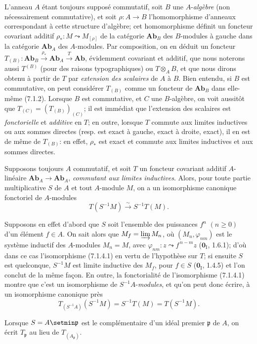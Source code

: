 \begin{env}[7.1.3]
L'anneau $A$ étant toujours supposé commutatif, soit $B$ une $A$-\emph{algèbre} (non
nécessairement commutative), et soit $\rho:A\to B$ l'homomorphisme d'anneaux
correspondant à cette structure d'algèbre; cet homomorphisme définit un
foncteur covariant
additif $\rho_*:M\leadsto M_{[\rho]}$
de la catégorie $\boldsymbol{Ab}_B$ des $B$-modules à gauche dans la catégorie
$\boldsymbol{Ab}_A$ des $A$-modules. Par composition, on en déduit un foncteur $T_{(B)}:\boldsymbol{Ab}_B\xrightarrow{\rho_*}\boldsymbol{Ab}_A\xrightarrow{T}\boldsymbol{Ab}$,
évidemment covariant et additif, que nous noterons aussi $T^{(B)}$ (pour des
raisons typographiques) ou $T\otimes_A B$, et que nous dirons obtenu à partir
de $T$ par \emph{extension des scalaires} de $A$ à $B$. Bien entendu, si $B$ est
commutative, on peut considérer $T_{(B)}$ comme un foncteur de
$\boldsymbol{Ab}_B$ dans elle-même (7.1.2). Lorsque $B$ est commutative, et $C$
une $B$-algèbre, on voit aussitôt que $T_{(C)}=(T_{(B)})_{(C)}$;
il est immédiat que l'extension des scalaires est \emph{fonctorielle} et \emph{additive} en
$T$; en outre, lorsque $T$ commute aux limites inductives ou aux sommes
directes (resp. est exact à gauche, exact à droite, exact), il en est de même
de $T_{(B)}$: en effet, $\rho_*$ est exact et commute aux limites inductives
et aux sommes directes.
\end{env}

\begin{env}[7.1.4]
Supposons toujours $A$ commutatif, et soit
$T$ un foncteur covariant additif
$A$-linéaire $\boldsymbol{Ab}_A\to\boldsymbol{Ab}_A$, \emph{commutant aux limites inductives}. Alors, pour toute partie
multiplicative $S$ de $A$ et tout $A$-module $M$, on a un isomorphisme
canonique fonctoriel de $A$-modules
\[
  T(S^{-1}M)\xrightarrow{\sim}S^{-1}T(M).
  \tag{7.1.4.1}\label{III.7.1.4.1.fr}
\]

Supposons en effet d'abord que $S$ soit l'ensemble des puissances $f^n$
$(n\geqslant0)$ d'un élément $f\in A$. On sait alors que $M_f=\varinjlim M_n$,
où $(M_n,\varphi_{nm})$ est le système inductif des $A$-modules $M_n=M$,
avec $\varphi_{nm}:z\leadsto f^{\,n-m}z$ ($\mathbf{0}_{\mathrm I}$, 1.6.1);
d'où dans ce cas l'isomorphisme (7.1.4.1) en vertu de l'hypothèse sur $T$; si
ensuite $S$ est quelconque, $S^{-1}M$ est limite inductive des $M_f$, pour
$f\in S$ ($\mathbf{0}_{\mathrm I}$, 1.4.5) et l'on conclut de la même façon. En outre,
la fonctorialité de l'isomorphisme (7.1.4.1) montre que c'est un isomorphisme
de $S^{-1}A$-\emph{modules}, et qu'on peut donc écrire, à un isomorphisme canonique
près
\[
  T_{(S^{-1}A)}(S^{-1}M)
  =
  S^{-1}T(M)
  =
  T(S^{-1}M).
  \tag{7.1.4.2}\label{III.7.1.4.2.fr}
\]

Lorsque $S=A\setmin\mathfrak p$ est le complémentaire d'un idéal premier
$\mathfrak p$ de $A$, on écrit $T_{\mathfrak p}$ au lieu de
$T_{(A_{\mathfrak p})}$.
\end{env}

